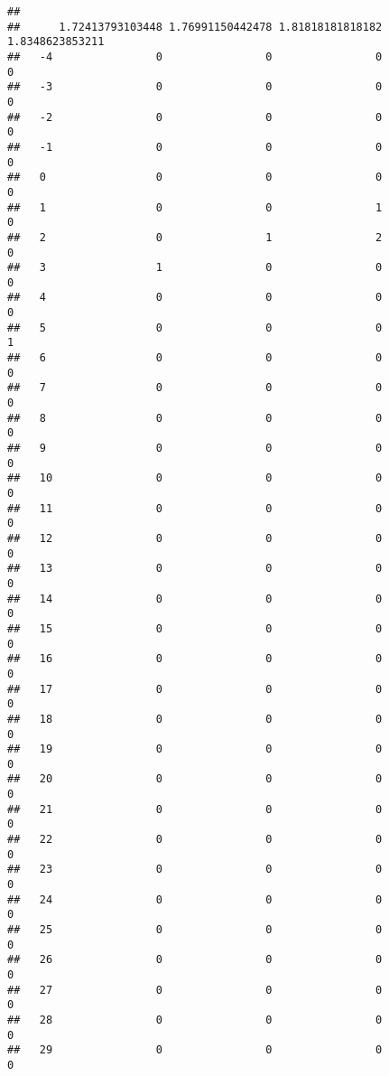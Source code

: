 \documentclass[]{article}
\begin{document}
\begin{verbatim}
##     
##      1.72413793103448 1.76991150442478 1.81818181818182 1.8348623853211
##   -4                0                0                0               0
##   -3                0                0                0               0
##   -2                0                0                0               0
##   -1                0                0                0               0
##   0                 0                0                0               0
##   1                 0                0                1               0
##   2                 0                1                2               0
##   3                 1                0                0               0
##   4                 0                0                0               0
##   5                 0                0                0               1
##   6                 0                0                0               0
##   7                 0                0                0               0
##   8                 0                0                0               0
##   9                 0                0                0               0
##   10                0                0                0               0
##   11                0                0                0               0
##   12                0                0                0               0
##   13                0                0                0               0
##   14                0                0                0               0
##   15                0                0                0               0
##   16                0                0                0               0
##   17                0                0                0               0
##   18                0                0                0               0
##   19                0                0                0               0
##   20                0                0                0               0
##   21                0                0                0               0
##   22                0                0                0               0
##   23                0                0                0               0
##   24                0                0                0               0
##   25                0                0                0               0
##   26                0                0                0               0
##   27                0                0                0               0
##   28                0                0                0               0
##   29                0                0                0               0

\end{verbatim}
\end{document}
